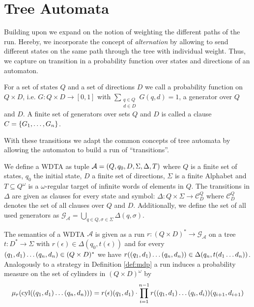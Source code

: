 \section{Tree Automata}
Building upon \cite{RandAutoInfTrees} we expand on the notion of weighting
the different paths of the run. Hereby, we incorporate the concept of
\emph{alternation} by allowing to send different states on the same path
through the tree with individual weight. Thus, we capture on transition in a
probability function over states and directions of an automaton.
\begin{definition}[Generator]
  For a set of states $Q$ and a set of directions $D$ we call a probability
  function on $Q\times D$, i.e. $G: Q\times D\rightarrow [0,1]$ with
  $\sum\limits_{\substack{q\in Q\\ d\in D}}G(q,d) = 1$, a generator over $Q$
  and $D$. A finite set of generators over sets $Q$ and $D$ is called a clause
  $C = \left\{G_{1},\dots,G_{n}\right\}$.
\end{definition}
With these transitions we adapt the common concepts of tree automata by
allowing the automaton to build a run of \enquote{transitions}.
\begin{definition}
  We define a \acl{WDTA} as tuple
  $\mathcal{A} = \left(Q, q_{0}, D, \Sigma, \Delta, T\right)$ where $Q$ is a finite
  set of states, $q_{0}$ the initial state, $D$ a finite set of directions,
  $\Sigma$ is a finite Alphabet and $T\subseteq Q^{\omega}$ is a
  $\omega$-regular target of infinite words of elements in $Q$. The transitions
  in $\Delta$ are given as clauses for every state and symbol:
  $\Delta:Q\times\Sigma\rightarrow\mathcal{C}^{Q}_{D}$
  where $\mathcal{C}^{Q}_{D}$ denotes the set of all clauses over $Q$ and $D$.
  Additionally, we define the set of all used generators as
  $\mathcal{G}_{\mathcal{A}} = \bigcup\limits_{q\in Q,\sigma\in\Sigma}
    \Delta(q,\sigma)$.
\end{definition}
The semantics of a \ac{WDTA} $\mathcal{A}$ is given as a run
$r:(Q\times D)^{*}\rightarrow \mathcal{G}_{\mathcal{A}}$ on a tree
$t:D^{*}\rightarrow\Sigma$ with $r(\epsilon)\in \Delta(q_0, t(\epsilon))$ and
for every $\left(q_{1},d_{1}\right)\dots\left(q_{n},d_{n}\right)\in(Q\times D)^{*}$ we
have $r(\left(q_{1},d_{1}\right)\dots\left(q_{n},d_{n}\right))\in
  \Delta(q_{n},t(d_{1}\dots d_{n}))$. Analogously to a strategy in Definition
\ref{def:mdp} a run induces a probability measure on the set of cylinders
in $(Q\times D)^{\omega}$ by
\begin{equation}
  \mu_{r}(\operatorname{cyl}(\left(q_{1},d_{1}\right)\dots\left(q_{n},d_{n}\right)))
    = r(\epsilon)(q_{1},d_{1})\cdot\prod\limits_{i = 1}^{n - 1}
    r(\left(q_{1},d_{1}\right)\dots\left(q_{i},d_{i}\right))(q_{i+1},d_{i+1})
\end{equation}
